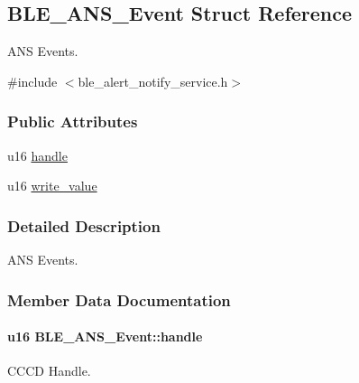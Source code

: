 \hypertarget{struct_b_l_e___a_n_s___event}{}\subsection{B\+L\+E\+\_\+\+A\+N\+S\+\_\+\+Event Struct Reference}
\label{struct_b_l_e___a_n_s___event}


A\+NS Events.  




{\ttfamily \#include $<$ble\+\_\+alert\+\_\+notify\+\_\+service.\+h$>$}

\subsubsection*{Public Attributes}
\begin{DoxyCompactItemize}
\item 
u16 \hyperlink{struct_b_l_e___a_n_s___event_ab94e9f1a490a1caf2e91045132046536}{handle}
\item 
u16 \hyperlink{struct_b_l_e___a_n_s___event_ac1f09880b6581a1a0458acdbaadaf39b}{write\+\_\+value}
\end{DoxyCompactItemize}


\subsubsection{Detailed Description}
A\+NS Events. 

\subsubsection{Member Data Documentation}
\paragraph[{\texorpdfstring{handle}{handle}}]{\setlength{\rightskip}{0pt plus 5cm}u16 B\+L\+E\+\_\+\+A\+N\+S\+\_\+\+Event\+::handle}\hypertarget{struct_b_l_e___a_n_s___event_ab94e9f1a490a1caf2e91045132046536}{}\label{struct_b_l_e___a_n_s___event_ab94e9f1a490a1caf2e91045132046536}
C\+C\+CD Handle. 
